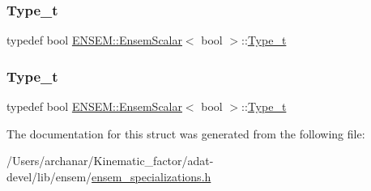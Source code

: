 \subsubsection{\texorpdfstring{Type\_t}{Type\_t}\hspace{0.1cm}{\footnotesize\ttfamily [2/3]}}
{\footnotesize\ttfamily typedef bool \mbox{\hyperlink{structENSEM_1_1EnsemScalar}{E\+N\+S\+E\+M\+::\+Ensem\+Scalar}}$<$ bool $>$\+::\mbox{\hyperlink{structENSEM_1_1EnsemScalar_3_01bool_01_4_a577829e3cf981727768117428436ac89}{Type\+\_\+t}}}

\mbox{\label{structENSEM_1_1EnsemScalar_3_01bool_01_4_a577829e3cf981727768117428436ac89}} 
\subsubsection{\texorpdfstring{Type\_t}{Type\_t}\hspace{0.1cm}{\footnotesize\ttfamily [3/3]}}
{\footnotesize\ttfamily typedef bool \mbox{\hyperlink{structENSEM_1_1EnsemScalar}{E\+N\+S\+E\+M\+::\+Ensem\+Scalar}}$<$ bool $>$\+::\mbox{\hyperlink{structENSEM_1_1EnsemScalar_3_01bool_01_4_a577829e3cf981727768117428436ac89}{Type\+\_\+t}}}



The documentation for this struct was generated from the following file\+:\begin{DoxyCompactItemize}
\item 
/\+Users/archanar/\+Kinematic\+\_\+factor/adat-\/devel/lib/ensem/\mbox{\hyperlink{adat-devel_2lib_2ensem_2ensem__specializations_8h}{ensem\+\_\+specializations.\+h}}\end{DoxyCompactItemize}
